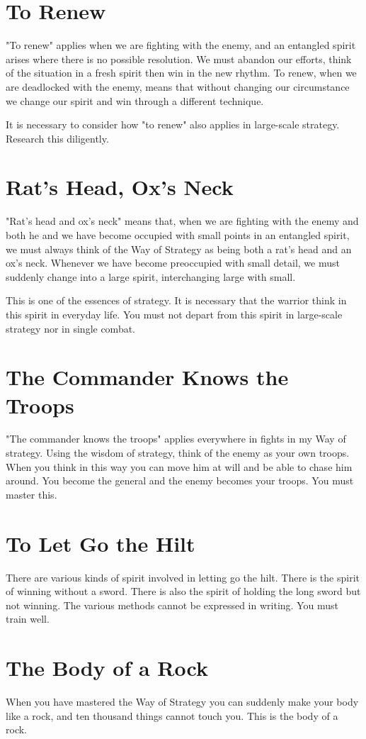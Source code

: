 \documentclass[12pt]{report}
\begin{document}
\section*{To Renew}
"To renew" applies when we are fighting with the enemy, and an entangled spirit arises where there is no possible resolution. We must abandon our efforts, think of the situation in a fresh spirit then win in the new rhythm. To renew, when we are deadlocked with the enemy, means that without changing our circumstance we change our spirit and win through a different technique.

It is necessary to consider how "to renew" also applies in large-scale strategy. Research this diligently.
\section*{Rat's Head, Ox's Neck}
"Rat's head and ox's neck" means that, when we are fighting with the enemy and both he and we have become occupied with small points in an entangled spirit, we must always think of the Way of Strategy as being both a rat's head and an ox's neck. Whenever we have become preoccupied with small detail, we must suddenly change into a large spirit, interchanging large with small.

This is one of the essences of strategy. It is necessary that the warrior think in this spirit in everyday life. You must not depart from this spirit in large-scale strategy nor in single combat.
\section*{The Commander Knows the Troops}
"The commander knows the troops" applies everywhere in fights in my Way of strategy. Using the wisdom of strategy, think of the enemy as your own troops. When you think in this way you can move him at will and be able to chase him around. You become the general and the enemy becomes your troops. You must master this.
\section*{To Let Go the Hilt}

There are various kinds of spirit involved in letting go the hilt. There is the spirit of winning without a sword. There is also the spirit of holding the long sword but not winning. The various methods cannot be expressed in writing. You must train well.
\section*{The Body of a Rock}
When you have mastered the Way of Strategy you can suddenly make your body like a rock, and ten thousand things cannot touch you. This is the body of a rock.
\end{document}
